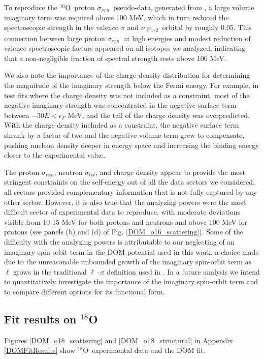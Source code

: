 \documentclass[twocolumn,secnumarabic,amssymb, nobibnotes, aps, prl,
superscriptaddress, nobalancelastpage, draft]{revtex4}
\newcommand{\tot}{\ensuremath{\sigma_{tot}}}
\newcommand{\rxn}{\ensuremath{\sigma_{rxn}}}
\newcommand{\oSix}{\ensuremath{^{16}}O}
\newcommand{\oEight}{\ensuremath{^{18}}O}
\newcommand{\pOne}{p\ensuremath{_{1/2}}}
\begin{document}
To reproduce the \oSix\ proton \rxn\
pseudo-data, generated from \cite{Carlson1975}, a large volume imaginary term
was required above 100 MeV, which in turn reduced the spectroscopic strength in
the valence $\pi$ and $\nu$ \pOne\ orbital by roughly 0.05. This connection
between large proton \rxn\ at high energies and modest reduction of valence
spectroscopic factors appeared on all isotopes we analyzed, indicating that a
non-negligible fraction of spectral strength rests above 100 MeV.

We also note the importance of the charge density distribution for determining the 
magnitude of the imaginary strength below the Fermi energy. For example, in test
fits where the charge density was not included as a constraint, most of the
negative imaginary strength was concentrated in the negative surface term
between $-30 E < \epsilon_{F}$ MeV, and the tail of the charge density was
overpredicted. With the charge density included as a constraint,
the negative surface term shrank by a factor of two and the negative volume term
grew to compensate, pushing nucleon density deeper in energy space and
increasing the binding energy closer to the experimental value.

The proton \rxn, neutron \tot, and charge density appear to provide the most
stringent constraints on the self-energy out of all the data sectors we
considered, all sectors provided complementary information that is not fully
captured by any other sector. However, it is also true that the analyzing powers
were the most difficult sector of experimental data to
reproduce, with moderate deviations visible from 10-15 MeV for both protons and
neutrons and above 100 MeV for protons (see panels (b) and (d) of
Fig. \ref{DOM_o16_scattering}). Some
of the difficulty with the analyzing powers is attributable to our neglecting of
an imaginary spin-orbit term in the DOM potential used in this work, a choice
made due to the unreasonable unbounded growth of the imaginary spin-orbit term
as $\ell$ grows in the traditional $\ell\cdot\sigma$ definition used in
\cite{KoningDelaroche}. In a future analysis we intend to quantitatively
investigate the importance of the imaginary spin-orbit term and to compare
different options for its functional form.

\subsection{Fit results on $^{18}$O}
Figures \ref{DOM_o18_scattering} and \ref{DOM_o18_structural} in Appendix
\ref{DOMFitResults} show \oEight\ experimental data and the DOM fit.
\end{document}
